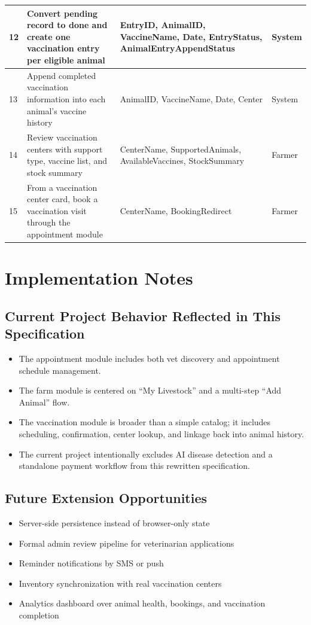 \documentclass[12pt]{article}
\begin{document}
\begin{longtable}{|p{1.2cm}|p{5.6cm}|p{5.7cm}|p{2cm}|}
\hline
\rowcolor{rowgray}
12 & Convert pending record to done and create one vaccination entry per eligible animal & EntryID, AnimalID, VaccineName, Date, EntryStatus, AnimalEntryAppendStatus & System \\
\hline
13 & Append completed vaccination information into each animal's vaccine history & AnimalID, VaccineName, Date, Center & System \\
\hline
\rowcolor{rowgray}
14 & Review vaccination centers with support type, vaccine list, and stock summary & CenterName, SupportedAnimals, AvailableVaccines, StockSummary & Farmer \\
\hline
15 & From a vaccination center card, book a vaccination visit through the appointment module & CenterName, BookingRedirect & Farmer \\
\hline
\end{longtable}

\newpage
\section{Implementation Notes}

\subsection{Current Project Behavior Reflected in This Specification}
\begin{itemize}
    \item The appointment module includes both vet discovery and appointment schedule management.
    \item The farm module is centered on ``My Livestock'' and a multi-step ``Add Animal'' flow.
    \item The vaccination module is broader than a simple catalog; it includes scheduling, confirmation, center lookup, and linkage back into animal history.
    \item The current project intentionally excludes AI disease detection and a standalone payment workflow from this rewritten specification.
\end{itemize}

\subsection{Future Extension Opportunities}
\begin{itemize}
    \item Server-side persistence instead of browser-only state
    \item Formal admin review pipeline for veterinarian applications
    \item Reminder notifications by SMS or push
    \item Inventory synchronization with real vaccination centers
    \item Analytics dashboard over animal health, bookings, and vaccination completion
\end{itemize}
\end{document}

